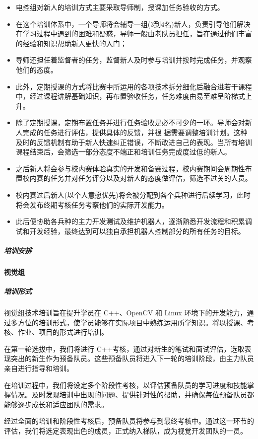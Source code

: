                 \begin{itemize}
                    \item 电控组对新人的培训方式主要采取导师制，授课加任务验收的方式。
                    \item 在这个培训体系中，一个导师将会辅导一组(3到4名)新人，负责引导他们解决在学习过程中遇到的困难和疑惑，导师一般由老队员担任，旨在通过他们丰富的经验和知识帮助新人更快的入门；
                    \item 导师还担任着监督者的任务，监督新人及时参与培训并按时完成任务，并观察他们的态度。
                    \item 此外，定期授课的方式将比赛中所运用的各项技术拆分细化后融合进若干课程中，经过课程讲解基础知识，再布置验收任务，任务难度由易至难呈阶梯式上升。
                    \item 除了定期授课，定期布置任务并进行任务验收是必不可少的一环。导师会对新人完成的任务进行评估，提供具体的反馈，并根 据需要调整培训计划。这种及时的反馈机制有助于新人快速纠正错误，不断改进自己的表现。当所有培训课程结束后，会筛选一部分态度不端正和培训任务完成度过低的新人。
                    \item 之后新人将会参与校内赛体验真实的开发和备赛过程，校内赛期间会周期性布置校内赛的任务并对任务评分以及对新人的态度做评估，筛选不过关的人员。
                    \item 校内赛过后新人(以个人意愿优先)将会被分配到各个兵种进行后续学习，此时将会发布终期考核任务考察他们的实际开发能力。
                    \item 此后便协助各兵种的主力开发测试及维护机器人，逐渐熟悉开发流程和积累调试和开发经验，最终达到可以独自承担机器人控制部分的所有任务的目标。
                \end{itemize}

            \subparagraph{培训安排}


        \paragraph{视觉组}

            \subparagraph{培训形式}

                视觉组技术培训旨在提升学员在 C++、OpenCV 和 Linux 环境下的开发能力，通过多方位的培训形式，使学员能够在实际项目中熟练运用所学知识。将以授课、考核、作业、项目的形式进行培训。\par
                在第一轮选拔中，我们将进行 C++考核，通过对新生的笔试和面试评估，选取表现突出的新生作为预备队员。这些预备队员将进入下一轮的培训阶段，由主力队员亲自进行指导和培训。\par
                在培训过程中，我们将设定多个阶段性考核，以评估预备队员的学习进度和技能掌握情况。及时发现培训中出现的问题、提供针对性的帮助，并确保每位预备队员都能够逐步成长和适应团队的需求。 \par
                经过全面的培训和阶段性考核后，预备队员将参与到最终考核中。通过这一环节的评估，我们将选定表现出色的成员，正式纳入梯队，成为视觉开发团队的一员。\par
                
